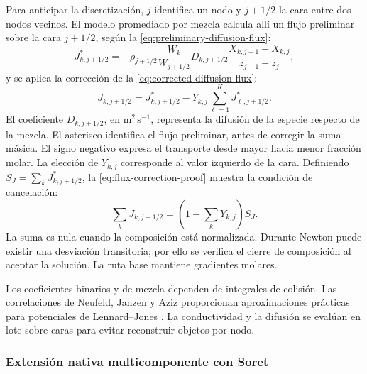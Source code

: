 \documentclass[12pt,a4paper,twoside,openany]{book}
\begin{document}
Para anticipar la discretización, \(j\) identifica un nodo y \(j+1/2\)
la cara entre dos nodos vecinos. El modelo promediado por mezcla calcula allí
un flujo preliminar sobre la cara \(j+1/2\), según la \cref{eq:preliminary-diffusion-flux}:
\begin{equation}
  J_{k,j+1/2}^{*}=-\rho_{j+1/2}
  \frac{W_k}{W_{j+1/2}}D_{k,j+1/2}
  \frac{X_{k,j+1}-X_{k,j}}{z_{j+1}-z_j},
  \label{eq:preliminary-diffusion-flux}
\end{equation}
y se aplica la corrección de la \cref{eq:corrected-diffusion-flux}:
\begin{equation}
  J_{k,j+1/2}=J_{k,j+1/2}^{*}
  -Y_{k,j}\sum_{\ell=1}^{K}J_{\ell,j+1/2}^{*}.
  \label{eq:corrected-diffusion-flux}
\end{equation}
El coeficiente \(D_{k,j+1/2}\), en \(\mathrm{m^2\,s^{-1}}\), representa
la difusión de la especie respecto de la mezcla. El asterisco identifica el
flujo preliminar, antes de corregir la suma másica. El signo negativo expresa
el transporte desde mayor hacia menor fracción molar. La elección de
\(Y_{k,j}\) corresponde al valor izquierdo de la cara.
Definiendo \(S_J=\sum_kJ^*_{k,j+1/2}\), la
\cref{eq:flux-correction-proof} muestra la condición de cancelación:
\begin{equation}
 \sum_kJ_{k,j+1/2}=\left(1-\sum_kY_{k,j}\right)S_J.
 \label{eq:flux-correction-proof}
\end{equation}
La suma es nula cuando la composición está normalizada. Durante Newton puede
existir una desviación transitoria; por ello se verifica el cierre de composición
al aceptar la solución. La ruta base mantiene gradientes molares.

Los coeficientes binarios y de mezcla dependen de integrales de colisión. Las
correlaciones de Neufeld, Janzen y Aziz proporcionan aproximaciones prácticas
para potenciales de Lennard--Jones \cite{Neufeld1972}. La conductividad y la
difusión se evalúan en lote sobre caras para evitar reconstruir objetos por nodo.

\subsubsection{Extensión nativa multicomponente con Soret}
\label{sec:native-soret-method}
\end{document}
